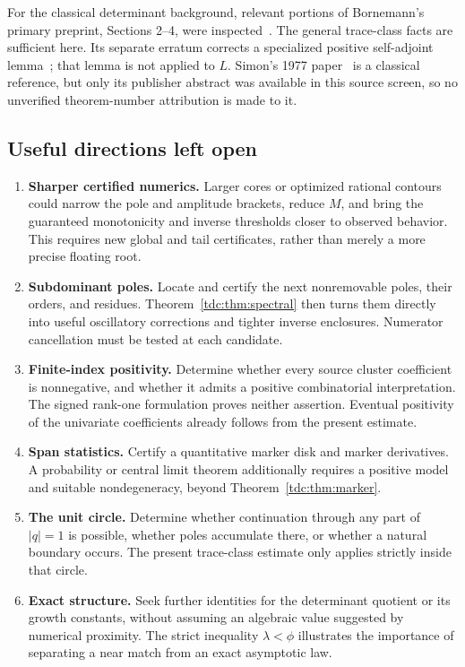 \documentclass[11pt]{article}
\theoremstyle{definition}\newtheorem{definition}[theorem]{Definition}
\theoremstyle{remark}\newtheorem{remark}[theorem]{Remark}
\begin{document}
For the classical determinant background, relevant portions of Bornemann's primary preprint, Sections 2--4, were inspected~\cite{bornemann}. The general trace-class facts are sufficient here. Its separate erratum corrects a specialized positive self-adjoint lemma~\cite{bornemannerratum}; that lemma is not applied to $L$. Simon's 1977 paper~\cite{simon} is a classical reference, but only its publisher abstract was available in this source screen, so no unverified theorem-number attribution is made to it.

\subsection{Useful directions left open}\label{tdc:sec:open}
\begin{enumerate}
\item \textbf{Sharper certified numerics.} Larger cores or optimized rational contours could narrow the pole and amplitude brackets, reduce $M$, and bring the guaranteed monotonicity and inverse thresholds closer to observed behavior. This requires new global and tail certificates, rather than merely a more precise floating root.
\item \textbf{Subdominant poles.} Locate and certify the next nonremovable poles, their orders, and residues. Theorem~\ref{tdc:thm:spectral} then turns them directly into useful oscillatory corrections and tighter inverse enclosures. Numerator cancellation must be tested at each candidate.
\item \textbf{Finite-index positivity.} Determine whether every source cluster coefficient is nonnegative, and whether it admits a positive combinatorial interpretation. The signed rank-one formulation proves neither assertion. Eventual positivity of the univariate coefficients already follows from the present estimate.
\item \textbf{Span statistics.} Certify a quantitative marker disk and marker derivatives. A probability or central limit theorem additionally requires a positive model and suitable nondegeneracy, beyond Theorem~\ref{tdc:thm:marker}.
\item \textbf{The unit circle.} Determine whether continuation through any part of $|q|=1$ is possible, whether poles accumulate there, or whether a natural boundary occurs. The present trace-class estimate only applies strictly inside that circle.
\item \textbf{Exact structure.} Seek further identities for the determinant quotient or its growth constants, without assuming an algebraic value suggested by numerical proximity. The strict inequality $\lambda<\phi$ illustrates the importance of separating a near match from an exact asymptotic law.
\end{enumerate}
\end{document}
